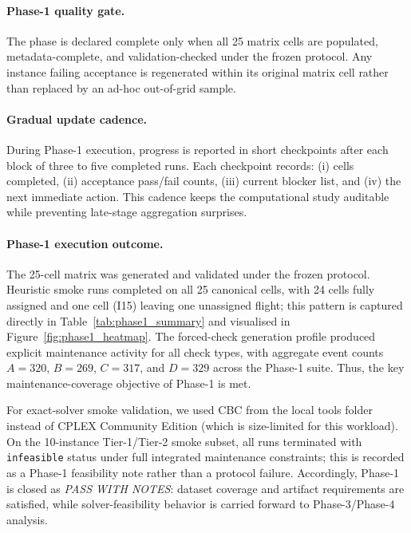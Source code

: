 \paragraph{Phase-1 quality gate.}
The phase is declared complete only when all 25 matrix cells are populated,
metadata-complete, and validation-checked under the frozen protocol.  Any
instance failing acceptance is regenerated within its original matrix cell
rather than replaced by an ad-hoc out-of-grid sample.

\paragraph{Gradual update cadence.}
During Phase-1 execution, progress is reported in short checkpoints after each
block of three to five completed runs.  Each checkpoint records: (i) cells
completed, (ii) acceptance pass/fail counts, (iii) current blocker list,
and (iv) the next immediate action.  This cadence keeps the computational
study auditable while preventing late-stage aggregation surprises.

\paragraph{Phase-1 execution outcome.}
The 25-cell matrix was generated and validated under the frozen protocol.
Heuristic smoke runs completed on all 25 canonical cells, with 24 cells fully
assigned and one cell (I15) leaving one unassigned flight; this pattern is
captured directly in Table~\ref{tab:phase1_summary} and visualised in
Figure~\ref{fig:phase1_heatmap}.  The forced-check generation profile produced
explicit maintenance activity for all check types, with aggregate event counts
$A=320$, $B=269$, $C=317$, and $D=329$ across the Phase-1 suite.  Thus, the
key maintenance-coverage objective of Phase-1 is met.

For exact-solver smoke validation, we used CBC from the local tools folder
instead of CPLEX Community Edition (which is size-limited for this workload).
On the 10-instance Tier-1/Tier-2 smoke subset, all runs terminated with
\texttt{infeasible} status under full integrated maintenance constraints;
this is recorded as a Phase-1 feasibility note rather than a protocol failure.
Accordingly, Phase-1 is closed as \emph{PASS WITH NOTES}: dataset coverage and
artifact requirements are satisfied, while solver-feasibility behavior is
carried forward to Phase-3/Phase-4 analysis.


